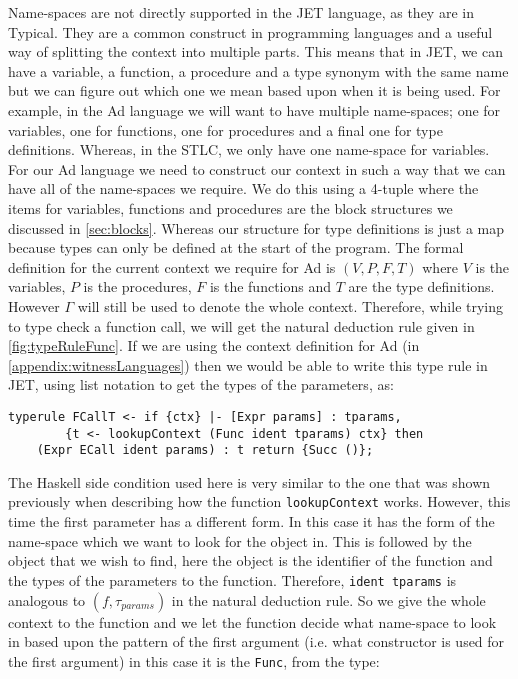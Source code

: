 Name-spaces are not directly supported in the JET language, as they are in Typical\cite{grimm2007typical}.
They are a common construct in programming languages and a useful way of splitting the context into multiple parts.
This means that in JET, we can have a variable, a function, a procedure and a type synonym with the same name but we can figure out which one we mean based upon when it is being used.
For example, in the Ad language we will want to have multiple name-spaces; one for variables, one for functions, one for procedures and a final one for type definitions.
Whereas, in the STLC, we only have one name-space for variables.
For our Ad language we need to construct our context in such a way that we can have all of the name-spaces we require.
We do this using a 4-tuple where the items for variables, functions and procedures are the block structures we discussed in \autoref{sec:blocks}.
Whereas our structure for type definitions is just a map because types can only be defined at the start of the program.
The formal definition for the current context we require for Ad is $(V, P, F, T)$ where $V$ is the variables, $P$ is the procedures, $F$ is the functions and $T$ are the type definitions.
However $\Gamma$ will still be used to denote the whole context.
Therefore, while trying to type check a function call, we will get the natural deduction rule given in \autoref{fig:typeRuleFunc}.
If we are using the context definition for Ad (in \autoref{appendix:witnessLanguages}) then we would be able to write this type rule in JET, using list notation to get the types of the parameters, as:
\begin{lstlisting}
typerule FCallT <- if {ctx} |- [Expr params] : tparams, 
        {t <- lookupContext (Func ident tparams) ctx} then 
    (Expr ECall ident params) : t return {Succ ()};
\end{lstlisting}
The Haskell side condition used here is very similar to the one that was shown previously when describing how the function \texttt{lookupContext} works.
However, this time the first parameter has a different form.
In this case it has the form of the name-space which we want to look for the object in.
This is followed by the object that we wish to find, here the object is the identifier of the function and the types of the parameters to the function.
Therefore, \texttt{ident tparams} is analogous to $(f, \tau_{params})$ in the natural deduction rule.
So we give the whole context to the function and we let the function decide what name-space to look in based upon the pattern of the first argument (i.e. what constructor is used for the first argument) in this case it is the \texttt{Func}, from the type:
